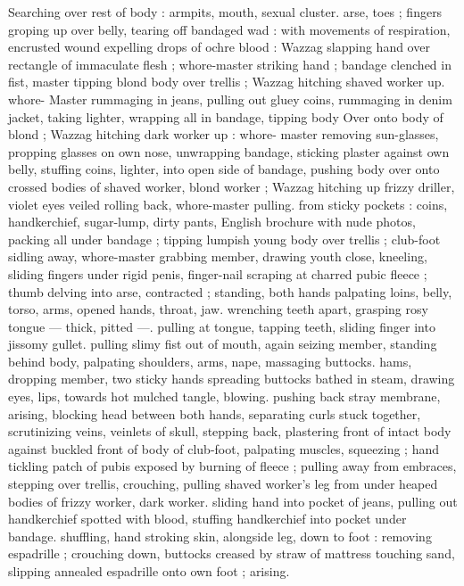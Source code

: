 {Searching over rest of body : armpits, mouth, sexual cluster. arse, 
toes ; fingers groping up over belly, tearing off bandaged wad : with 
movements of respiration, encrusted wound expelling drops of ochre 
blood : Wazzag slapping hand over rectangle of immaculate flesh ; 
whore-master striking hand ; bandage clenched in fist, master tipping 
blond body over trellis ; Wazzag hitching shaved worker up. whore- 
Master rummaging in jeans, pulling out gluey coins, rummaging in 
denim jacket, taking lighter, wrapping all in bandage, tipping body 
Over onto body of blond ; Wazzag hitching dark worker up : whore- 
master removing sun-glasses, propping glasses on own nose, 
unwrapping bandage, sticking plaster against own belly, stuffing 
coins, lighter, into open side of bandage, pushing body over onto 
crossed bodies of shaved worker, blond worker ; Wazzag hitching up 
frizzy driller, violet eyes veiled rolling back, whore-master pulling. 
from sticky pockets : coins, handkerchief, sugar-lump, dirty pants, 
English brochure with nude photos, packing all under bandage ; 
tipping lumpish young body over trellis ; club-foot sidling away, 
whore-master grabbing member, drawing youth close, kneeling, 
sliding fingers under rigid penis, finger-nail scraping at charred 
pubic fleece ; thumb delving into arse, contracted ; standing, both 
hands palpating loins, belly, torso, arms, opened hands, throat, jaw. 
wrenching teeth apart, grasping rosy tongue --- thick, pitted ---. 
pulling at tongue, tapping teeth, sliding finger into jissomy gullet. 
pulling slimy fist out of mouth, again seizing member, standing 
behind body, palpating shoulders, arms, nape, massaging buttocks. 
hams, dropping member, two sticky hands spreading buttocks bathed 
in steam, drawing eyes, lips, towards hot mulched tangle, blowing. 
pushing back stray membrane, arising, blocking head between both 
hands, separating curls stuck together, scrutinizing veins, veinlets of 
skull, stepping back, plastering front of intact body against buckled 
front of body of club-foot, palpating muscles, squeezing ; hand 
tickling patch of pubis exposed by burning of fleece ; pulling away 
from embraces, stepping over trellis, crouching, pulling shaved 
worker's leg from under heaped bodies of frizzy worker, dark worker. 
sliding hand into pocket of jeans, pulling out handkerchief spotted 
with blood, stuffing handkerchief into pocket under bandage. 
shuffling, hand stroking skin, alongside leg, down to foot : removing 
espadrille ; crouching down, buttocks creased by straw of mattress 
touching sand, slipping annealed espadrille onto own foot ; arising. 
}
